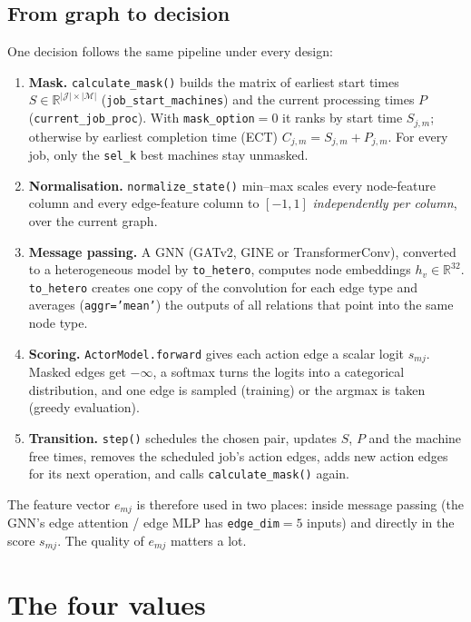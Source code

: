 \documentclass[11pt,a4paper]{article}
\newcommand{\Jset}{\mathcal{J}}
\newcommand{\Mset}{\mathcal{M}}
\newcommand{\R}{\mathbb{R}}
\newcommand{\code}[1]{\texttt{#1}}
\theoremstyle{remark}
\begin{document}
\subsection{From graph to decision}
One decision follows the same pipeline under every design:
\begin{enumerate}
  \item \textbf{Mask.} \code{calculate\_mask()} builds the matrix of earliest start
        times $S\in\R^{|\Jset|\times|\Mset|}$ (\code{job\_start\_machines}) and the
        current processing times $P$ (\code{current\_job\_proc}). With
        \code{mask\_option}$=0$ it ranks by start time $S_{j,m}$; otherwise by earliest
        completion time (ECT) $C_{j,m}=S_{j,m}+P_{j,m}$. For every job, only the
        \code{sel\_k} best machines stay unmasked.
  \item \textbf{Normalisation.} \code{normalize\_state()} min--max scales every
        node-feature column and every edge-feature column to $[-1,1]$
        \emph{independently per column}, over the current graph.
  \item \textbf{Message passing.} A GNN (GATv2, GINE or TransformerConv), converted
        to a heterogeneous model by \code{to\_hetero}, computes node embeddings
        $h_v\in\R^{32}$. \code{to\_hetero} creates one copy of the convolution for each
        edge type and averages (\code{aggr='mean'}) the outputs of all relations that
        point into the same node type.
  \item \textbf{Scoring.} \code{ActorModel.forward} gives each action edge a scalar
        logit $s_{mj}$. Masked edges get $-\infty$, a softmax turns the logits into a
        categorical distribution, and one edge is sampled (training) or the argmax
        is taken (greedy evaluation).
  \item \textbf{Transition.} \code{step()} schedules the chosen pair, updates $S$, $P$
        and the machine free times, removes the scheduled job's action edges, adds
        new action edges for its next operation, and calls \code{calculate\_mask()}
        again.
\end{enumerate}
The feature vector $e_{mj}$ is therefore used in two places: inside message passing
(the GNN's edge attention / edge MLP has \code{edge\_dim}$=5$ inputs) and directly in the
score $s_{mj}$. The quality of $e_{mj}$ matters a lot.

\section{The four values}
\label{sec:values}
\end{document}
